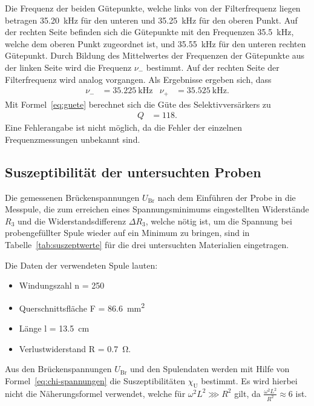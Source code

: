 Die Frequenz der beiden Gütepunkte, welche links von der Filterfrequenz 
liegen betragen \SI{35.20}{\kilo\hertz} für den unteren und 
\SI{35.25}{\kilo\hertz} für den oberen Punkt.
Auf der rechten Seite befinden sich die Gütepunkte mit den Frequenzen 
\SI{35.5}{\kilo\hertz}, welche dem oberen Punkt zugeordnet ist, und 
\SI{35.55}{\kilo\hertz} für den unteren rechten Gütepunkt.
Durch Bildung des Mittelwertes der Frequenzen der Gütepunkte aus der 
linken Seite wird die Frequenz $\nu_-$ bestimmt. 
Auf der rechten Seite der Filterfrequenz wird analog vorgangen.
Als Ergebnisse ergeben sich, dass
%
\begin{align*}
  \nu_- &= \SI{35.225}{\kilo\hertz} &
  \nu_+ &= \SI{35.525}{\kilo\hertz}.
\end{align*}
%
Mit Formel~\eqref{eq:guete} berechnet sich die Güte des Selektivversärkers zu
%
\begin{align*}
  Q &= \num{118}.
\end{align*}
%
Eine Fehlerangabe ist nicht möglich, da die Fehler der einzelnen 
Frequenzmessungen unbekannt sind.
%
\FloatBarrier
\subsection{Suszeptibilität der untersuchten Proben}
%
Die gemessenen Brückenspannungen $U_\text{Br}$ nach dem Einführen der Probe in 
die Messpule, die zum erreichen eines Spannungsminimums eingestellten 
Widerstände $R_3$ und die Widerstandsdifferenz $\Delta R_3$, welche nötig 
ist, um die Spannung bei probengefüllter Spule wieder auf ein Minimum zu 
bringen, sind in Tabelle~\ref{tab:suszeptwerte} für die drei untersuchten 
Materialien eingetragen.

Die Daten der verwendeten Spule lauten:
\begin{itemize}
\item Windungszahl n = 250
\item Querschnittsfläche F = \SI{86.6}{\milli\metre^2}
\item Länge l = \SI{13.5}{\centi\metre}
\item Verlustwiderstand R = \SI{0.7}{\ohm}.
\end{itemize}

Aus den Brückenspannungen $U_\text{Br}$ und den Spulendaten werden mit Hilfe von 
Formel~\eqref{eq:chi-spannungen} die Suszeptibilitäten $\chi_\text{U}$ bestimmt. Es wird hierbei nicht 
die Näherungsformel verwendet, welche für $\omega^2 L^2 \ggg R^2$ gilt, 
da $\frac{\omega^2 L^2}{R^2} \approx 6$ ist.

